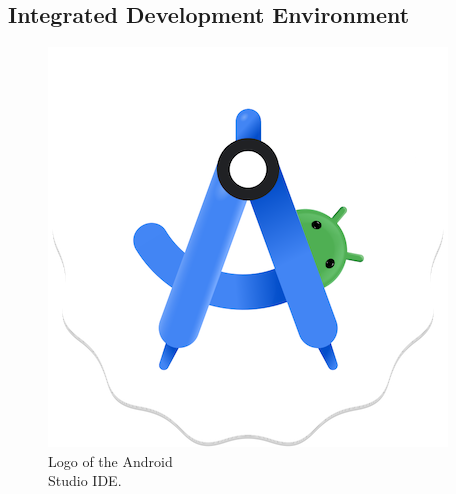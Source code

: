 



\newpage
\subsection{Integrated Development Environment}

\begin{figure} %
    \captionsetup{font=footnotesize}
    \centering
    \includegraphics[width=\linewidth]{images/android_studio.png}
    \caption{Logo of the Android\\Studio IDE.}
\end{figure}

